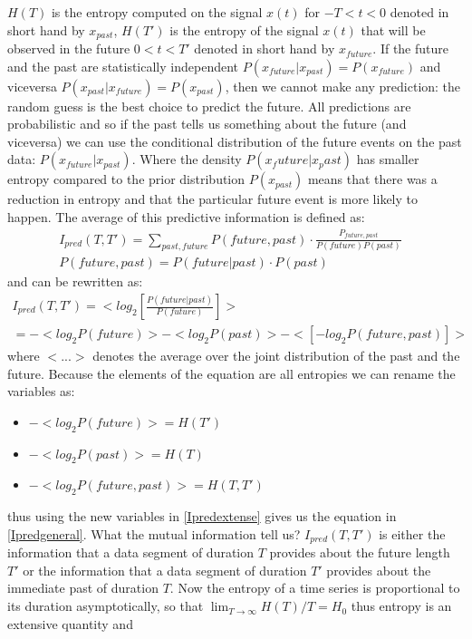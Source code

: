 $H(T)$ is the entropy computed on the signal $x(t)$ for $-T<t<0$ denoted in short
 hand by $x_{past}$, $H(T')$ is the entropy of the signal $x(t)$ that will be observed
 in the future $0<t<T'$ denoted in short hand by $x_{future}$. If the future and the
 past are statistically independent $P(x_{future}|x_{past})=P(x_{future})$
and viceversa $P(x_{past}|x_{future})=P(x_{past})$, then we cannot make any prediction:
the random guess is the best choice to predict the future. All predictions are
 probabilistic and so if the past tells us something about the future (and viceversa)
 we can use the conditional distribution of the future events on the past data:
$P(x_{future}|x_{past})$. Where the density $P(x_future|x_past)$ has smaller
entropy compared to the prior distribution $P(x_{past})$ means that there was
 a reduction in entropy and that the particular future event is more likely to happen.
The average of this predictive information is defined as:
\begin{eqnarray}
I_{pred}(T,T')=\sum_{past,future} P(future,past)\cdot \frac{P_{future,past}}{P(future) P(past)}&\\
P(future,past)=P(future|past)\cdot P(past)&
\end{eqnarray}
and can be rewritten as:
\begin{eqnarray}
 I_{pred}(T,T')=<log_2 [\frac{P(future|past)}{P(future)}]>& \\
=-<log_2 P(future)> -<log_2 P(past)> -<[-log_2 P(future,past)]>& \label{Ipredextense}
\end{eqnarray}
where $<...>$ denotes the average over the joint distribution of the past and the future.
Because the elements of the equation are all entropies we can rename the variables as:
\begin{itemize}
\item $-<log_2 P(future)>=H(T')$
\item $-<log_2 P(past)>=H(T)$
\item $-<log_2 P(future,past)>=H(T,T')$
\end{itemize}
thus using the new variables in \ref{Ipredextense} gives us the equation in \ref{Ipredgeneral}.
What the mutual information tell us?
$I_{pred}(T,T')$ is either the information that a data segment of duration $T$
provides about the future length $T'$ or the information that a data segment of
duration $T'$ provides about the immediate past of duration $T$.
Now the entropy of a time series is proportional to its duration asymptotically,
so that $\lim_{T\to\infty} H(T)/T=H_0$ thus entropy is an extensive quantity and
